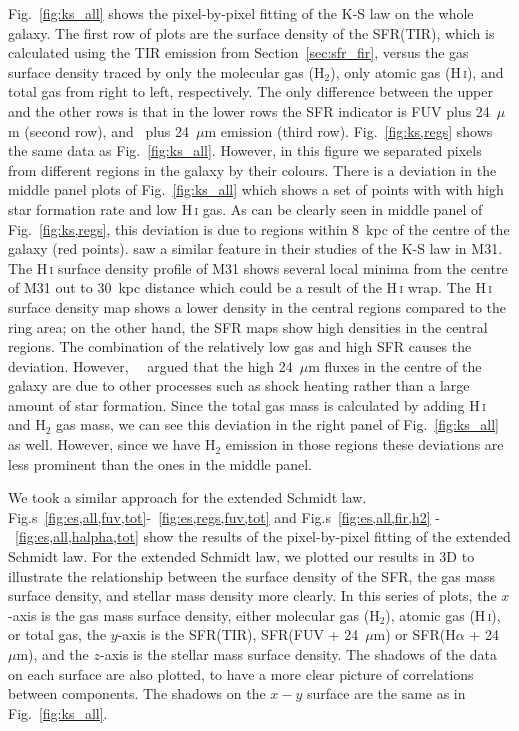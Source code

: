 Fig.~\ref{fig:ks_all} shows the pixel-by-pixel fitting of the K-S law on the whole galaxy. The first row of plots are the surface density of the SFR(TIR), which is calculated using the TIR emission from Section~\ref{sec:sfr_fir}, versus the gas surface density traced by only the molecular gas (H$_2$), only atomic gas (H\,{\textsc i}), and total gas from right to left, respectively. 
The only difference between the upper and the other rows is that in the lower rows the SFR indicator is FUV plus 24~$\mu$m (second row), and \halpha\ plus 24~$\mu$m emission (third row). Fig.~\ref{fig:ks,regs} shows the same data as Fig.~\ref{fig:ks_all}. However, in this figure we separated pixels from different regions in the galaxy by their colours. 
 There is a deviation in the middle panel plots of Fig.~\ref{fig:ks_all} which shows a set of points with with high star formation rate and low H\,{\textsc i} gas.
As can be clearly seen in middle panel of Fig.~\ref{fig:ks,regs}, this deviation is due to regions within 8~kpc of the centre of the galaxy (red points).
 \cite{Braun09} saw a similar feature in their studies of the K-S law in M31. 
The H\,{\textsc i} surface density profile of M31 \citep[see figure 16 in][]{Chemin09} shows several local minima from the centre of M31 out to 30~kpc distance which could be a result of the H\,{\textsc i} wrap. The H\,{\textsc i} surface density map shows a lower density in the central regions compared to the ring area; on the other hand, the SFR maps show high densities in the central regions. The combination of the relatively low gas and high SFR causes the deviation. However,~~\cite{Braun09} argued that the high 24~$\mu$m fluxes in the centre of the galaxy are due to other processes such as shock heating rather than a large amount of star formation.
Since the total gas mass is calculated by adding H\,{\textsc i} and H$_2$ gas mass, we can see this deviation in the right panel of Fig.~\ref{fig:ks_all} as well. However, since we have H$_2$ emission in those regions these deviations are less prominent than the ones in the middle panel.

We took a similar approach for the extended Schmidt law. Fig.s~\ref{fig:es,all,fuv,tot}-~\ref{fig:es,regs,fuv,tot} and Fig.s~\ref{fig:es,all,fir,h2} - ~\ref{fig:es,all,halpha,tot} show the results of the pixel-by-pixel fitting of the extended Schmidt law. For the extended Schmidt law, we plotted our results in 3D to illustrate the relationship between the surface density of the SFR, the gas mass surface density, and stellar mass density more clearly. In this series of plots, the $x$-axis is the gas mass surface density, either molecular gas (H$_2$), atomic gas (H\,{\textsc i}), or total gas, the $y$-axis is the SFR(TIR), SFR(FUV + 24~$\mu$m) or SFR(H$\alpha$ + 24~$\mu$m), and the $z$-axis is the stellar mass surface density. The shadows of the data on each surface are also plotted, to have a more clear picture of correlations between components. The shadows on the $x-y$ surface are the same as in Fig.~\ref{fig:ks_all}. 

